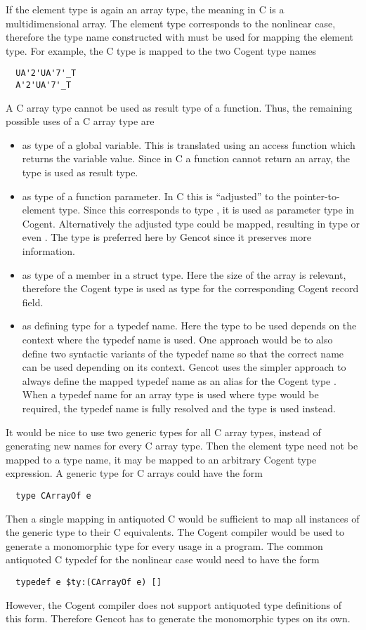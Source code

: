 If the element type  is again an array type, the meaning in C is a multidimensional array. The
element type corresponds to the nonlinear case, therefore the type name constructed with 
must be used for mapping the element type. For example, the C type  is mapped to the
two Cogent type names
\begin{verbatim}
  UA'2'UA'7'_T
  A'2'UA'7'_T
\end{verbatim}

A C array type cannot be used as result type of a function. Thus, the remaining possible uses of a C array type are
\begin{itemize}
\item as type of a global variable. This is translated using an access function which returns the variable
value. Since in C a function cannot return an array, the type  is used as result type.
\item as type of a function parameter. In C this is ``adjusted'' to the pointer-to-element type. Since this
corresponds to type , it is used as parameter type in Cogent. Alternatively the adjusted type
could be mapped, resulting in type  or even . The type  is preferred here
by Gencot since it preserves more information.
\item as type of a member in a struct type. Here the size of the array is relevant, therefore the Cogent type
 is used as type for the corresponding Cogent record field.
\item as defining type for a typedef name. Here the type to be used depends on the context where the typedef
name is used. One approach would be to also define two syntactic variants of the typedef name so that the 
correct name can be used depending on its context. Gencot uses the simpler approach to always define the mapped 
typedef name as an alias for the Cogent type . When a typedef name for an array type is used where 
type  would be required, the typedef name is fully resolved and the type  is used
instead.
\end{itemize}

It would be nice to use two generic types for all C array types, instead of generating new names for every 
C array type. Then the element type need not be mapped to a type name, it may be mapped
to an arbitrary Cogent type expression. A generic type for
C arrays could have the form
\begin{verbatim}
  type CArrayOf e
\end{verbatim}
Then a single mapping in antiquoted C would be sufficient to map all instances of the generic type to their 
C equivalents. The Cogent compiler would be used to generate a monomorphic type for every usage in a program. 
The common antiquoted C typedef for the nonlinear case would need to have the form 
\begin{verbatim}
  typedef e $ty:(CArrayOf e) []
\end{verbatim}
However, the Cogent compiler does not support antiquoted type definitions of this form. Therefore Gencot has to
generate the monomorphic types on its own. 

